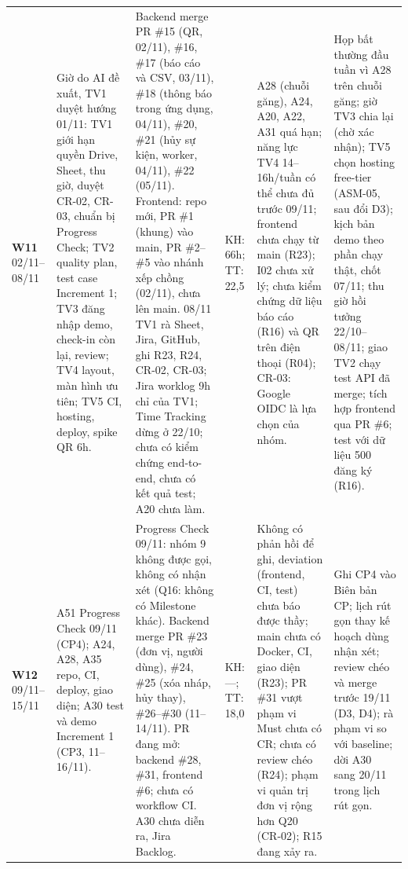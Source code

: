 \begin{landscape}
\begin{longtable}{L{1.69cm}L{3.73cm}L{5.08cm}L{1.86cm}L{3.39cm}L{3.73cm}}
\textbf{W11} 02/11--08/11 & Giờ do AI đề xuất, TV1 duyệt hướng 01/11: TV1 giới hạn quyền Drive, Sheet, thu giờ, duyệt CR-02, CR-03, chuẩn bị Progress Check; TV2 quality plan, test case Increment 1; TV3 đăng nhập demo, check-in còn lại, review; TV4 layout, màn hình ưu tiên; TV5 CI, hosting, deploy, spike QR 6h. & Backend merge PR \#15 (QR, 02/11), \#16, \#17 (báo cáo và CSV, 03/11), \#18 (thông báo trong ứng dụng, 04/11), \#20, \#21 (hủy sự kiện, worker, 04/11), \#22 (05/11). Frontend: repo mới, PR \#1 (khung) vào main, PR \#2–\#5 vào nhánh xếp chồng (02/11), chưa lên main. 08/11 TV1 rà Sheet, Jira, GitHub, ghi R23, R24, CR-02, CR-03; Jira worklog 9h chỉ của TV1; Time Tracking dừng ở 22/10; chưa có kiểm chứng end-to-end, chưa có kết quả test; A20 chưa làm. & KH: 66h; TT: 22,5 & A28 (chuỗi găng), A24, A20, A22, A31 quá hạn; năng lực TV4 14–16h/tuần có thể chưa đủ trước 09/11; frontend chưa chạy từ main (R23); I02 chưa xử lý; chưa kiểm chứng dữ liệu báo cáo (R16) và QR trên điện thoại (R04); CR-03: Google OIDC là lựa chọn của nhóm. & Họp bất thường đầu tuần vì A28 trên chuỗi găng; giờ TV3 chia lại (chờ xác nhận); TV5 chọn hosting free-tier (ASM-05, sau đổi D3); kịch bản demo theo phần chạy thật, chốt 07/11; thu giờ hồi tưởng 22/10–08/11; giao TV2 chạy test API đã merge; tích hợp frontend qua PR \#6; test với dữ liệu 500 đăng ký (R16). \\
\textbf{W12} 09/11--15/11 & A51 Progress Check 09/11 (CP4); A24, A28, A35 repo, CI, deploy, giao diện; A30 test và demo Increment 1 (CP3, 11–16/11). & Progress Check 09/11: nhóm 9 không được gọi, không có nhận xét (Q16: không có Milestone khác). Backend merge PR \#23 (đơn vị, người dùng), \#24, \#25 (xóa nháp, hủy thay), \#26–\#30 (11–14/11). PR đang mở: backend \#28, \#31, frontend \#6; chưa có workflow CI. A30 chưa diễn ra, Jira Backlog. & KH: ---; TT: 18,0 & Không có phản hồi để ghi, deviation (frontend, CI, test) chưa báo được thầy; main chưa có Docker, CI, giao diện (R23); PR \#31 vượt phạm vi Must chưa có CR; chưa có review chéo (R24); phạm vi quản trị đơn vị rộng hơn Q20 (CR-02); R15 đang xảy ra. & Ghi CP4 vào Biên bản CP; lịch rút gọn thay kế hoạch dùng nhận xét; review chéo và merge trước 19/11 (D3, D4); rà phạm vi so với baseline; dời A30 sang 20/11 trong lịch rút gọn. \\

\end{longtable}
\end{landscape}
